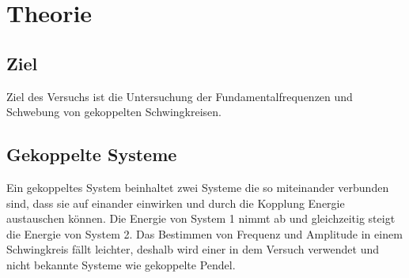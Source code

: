 \section{Theorie}
\label{sec:Theorie}
\subsection{Ziel}
Ziel des Versuchs ist die Untersuchung der Fundamentalfrequenzen und Schwebung von gekoppelten Schwingkreisen.
\subsection{Gekoppelte Systeme}
Ein gekoppeltes System beinhaltet zwei Systeme die so miteinander verbunden sind,
dass sie auf einander einwirken und durch die Kopplung Energie austauschen können.
Die Energie von System 1 nimmt ab und gleichzeitig steigt die Energie von System 2.
Das Bestimmen von Frequenz und Amplitude in einem Schwingkreis fällt leichter,
deshalb wird einer in dem Versuch verwendet und nicht bekannte Systeme wie gekoppelte Pendel.\\
